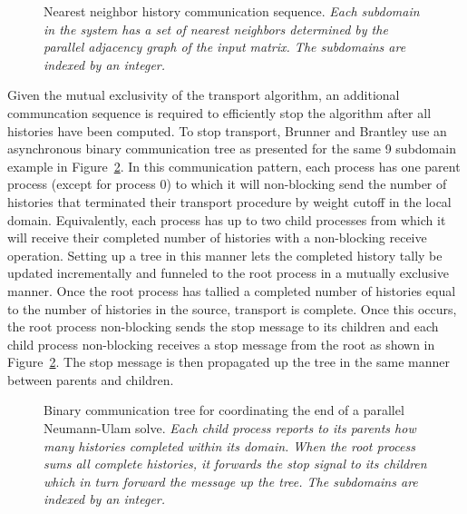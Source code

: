 \documentclass{snamc2013}
\begin{document}
\begin{figure}[h!]
  \begin{center}
    \scalebox{0.7}{  }
  \end{center}
  \caption{Nearest neighbor history communication sequence.
    \textit{Each subdomain in the system has a set of nearest
      neighbors determined by the parallel adjacency graph of the
      input matrix. The subdomains are indexed by an integer.}}
  \label{fig:nearest_neighbor_comm}
\end{figure}

Given the mutual exclusivity of the transport algorithm, an additional
communcation sequence is required to efficiently stop the algorithm
after all histories have been computed. To stop transport, Brunner and
Brantley use an asynchronous binary communication tree as presented
for the same 9 subdomain example in
Figure~\ref{fig:binary_comm_tree}. In this communication pattern, each
process has one parent process (except for process 0) to which it will
non-blocking send the number of histories that terminated their
transport procedure by weight cutoff in the local
domain. Equivalently, each process has up to two child processes from
which it will receive their completed number of histories with a
non-blocking receive operation. Setting up a tree in this manner lets
the completed history tally be updated incrementally and funneled to
the root process in a mutually exclusive manner. Once the root process
has tallied a completed number of histories equal to the number of
histories in the source, transport is complete. Once this occurs, the
root process non-blocking sends the stop message to its children and
each child process non-blocking receives a stop message from the root
as shown in Figure~\ref{fig:binary_comm_tree}. The stop message is
then propagated up the tree in the same manner between parents and
children.
\begin{figure}[h!]
  \begin{center}
    \scalebox{0.6}{
       }
  \end{center}
  \caption{Binary communication tree for coordinating the end of a
    parallel Neumann-Ulam solve. \textit{Each child process reports to
      its parents how many histories completed within its domain. When
      the root process sums all complete histories, it forwards the
      stop signal to its children which in turn forward the message up
      the tree. The subdomains are indexed by an integer.}}
  \label{fig:binary_comm_tree}
\end{figure}
\end{document}
